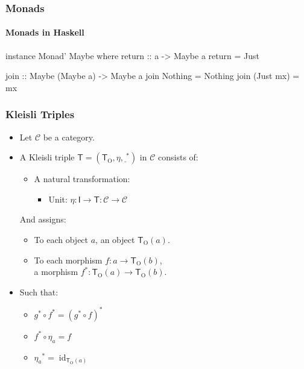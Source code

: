 \documentclass{beamer}
\DeclareMathOperator{\obj}{O}
\DeclareMathOperator{\id}{id}
\newcommand{\idO}[1]{\natO{\id}{#1}}
\newcommand{\comp}{\ensuremath{\mathrel{\circ}}}
\newcommand{\cat}[1]{\ensuremath{\mathcal{#1}}}
\newcommand{\func}[1]{\ensuremath{\mathsf{#1}}}
\newcommand{\funcO}[1]{\ensuremath{\func{#1}_{\obj}}}
\newcommand{\nat}[1]{\ensuremath{#1}}
\newcommand{\natO}[2]{\ensuremath{\nat{#1}_{#2}}}
\newcommand{\underscore}{\ensuremath{\underline{\ }}}
\newcommand{\mon}[1]{\func{#1}}
\newcommand{\monM}[2]{\ensuremath{#2^*}}
\begin{document}

\begin{frame}[fragile]
  \frametitle{Monads}
  \framesubtitle{Monads in Haskell}

  \begin{example}
    \begin{code}
instance Monad' Maybe where
  return :: a -> Maybe a
  return = Just

  join :: Maybe (Maybe a) -> Maybe a
  join Nothing   = Nothing
  join (Just mx) = mx
    \end{code}
  \end{example}

\end{frame}


\begin{frame}
  \frametitle{Kleisli Triples}

  \begin{definition}
    \begin{itemize}
    \item
      Let \cat{C} be a category.
    \item
      A Kleisli triple $\mon{T} = (\funcO{T}, \nat{\eta},
      \monM{T}{\underscore})$ in $\cat{C}$ consists of:
      \begin{itemize}
      \item
        A natural transformation:
        \begin{itemize}
        \item
          Unit: $\nat{\eta}: \func{I} \to \func{T}: \cat{C} \to
          \cat{C}$
        \end{itemize}
      \end{itemize}
      And assigns:
      \begin{itemize}
      \item
        To each object $a$, an object $\funcO{T}(a)$.
      \item
        To each morphism $f: a \to \funcO{T}(b)$,\\ a morphism
        $\monM{T}{f}: \funcO{T}(a) \to \funcO{T}(b)$.
      \end{itemize}
    \item
      Such that:
      \begin{itemize}
      \item
        $\monM{T}{g} \comp \monM{T}{f} = \monM{T}{(\monM{T}{g} \comp
        f)}$
      \item
        $\monM{T}{f} \comp \natO{\eta}{a} = f$
      \item
        $\monM{T}{\natO{\eta}{a}} = \idO{\funcO{T}(a)}$
      \end{itemize}
    \end{itemize}
  \end{definition}

\end{frame}
\end{document}
